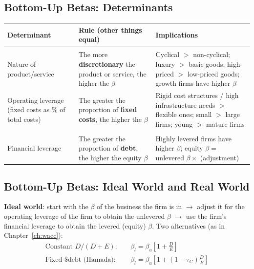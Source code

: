 \subsection{Bottom-Up Betas: Determinants}
\begin{center}
\small
\begin{tabularx}{\textwidth}{@{}>{\raggedright\arraybackslash}p{3.6cm}>{\raggedright\arraybackslash}X>{\raggedright\arraybackslash}X@{}}
\toprule
\textbf{Determinant} & \textbf{Rule (other things equal)} & \textbf{Implications}\\
\midrule
\multicolumn{3}{@{}l}{\emph{Beta of the firm (unlevered $\beta$)}}\\
Nature of product/service & The more \textbf{discretionary} the product or service, the higher the $\beta$ & Cyclical $>$ non-cyclical; luxury $>$ basic goods; high-priced $>$ low-priced goods; growth firms have higher $\beta$\\
Operating leverage (fixed costs as \% of total costs) & The greater the proportion of \textbf{fixed costs}, the higher the $\beta$ & Rigid cost structures / high infrastructure needs $>$ flexible ones; small $>$ large firms; young $>$ mature firms\\
\midrule
\multicolumn{3}{@{}l}{\emph{Beta of equity (levered $\beta$)}}\\
Financial leverage & The greater the proportion of \textbf{debt}, the higher the equity $\beta$ & Highly levered firms have higher $\beta$; equity $\beta=$ unlevered $\beta\times$ (adjustment)\\
\bottomrule
\end{tabularx}
\end{center}

\subsection{Bottom-Up Betas: Ideal World and Real World}
\textbf{Ideal world}: start with the $\beta$ of the business the firm is in $\to$ adjust it for the operating leverage of the firm to obtain the unlevered $\beta$ $\to$ use the firm's financial leverage to obtain the levered (equity) $\beta$. Two alternatives (as in Chapter~\ref{ch:wacc}):
\begin{align*}
\text{Constant } D/(D+E):&\quad \beta_l=\beta_u\left[1+\frac{D}{E}\right]\\
\text{Fixed \$ debt (Hamada)}:&\quad \beta_l=\beta_u\left[1+(1-\tau_C)\frac{D}{E}\right]
\end{align*}

